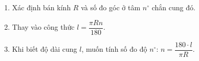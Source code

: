 \begin{enumerate}
\item Xác định bán kính $R$ và số đo góc ở tâm $n^\circ$ chắn cung đó.
\item Thay vào công thức $l = \dfrac{\pi R n}{180}$.
\item Khi biết độ dài cung $l$, muốn tính số đo độ $n^\circ$: $\boxed{n = \dfrac{180 \cdot l}{\pi R}}$.
\end{enumerate}
